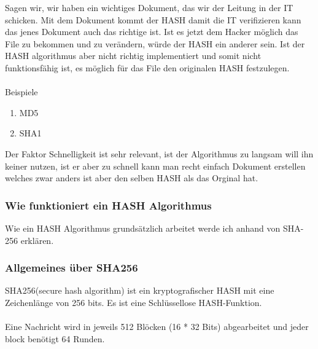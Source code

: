 {Sagen wir, wir haben ein wichtiges Dokument, das wir der Leitung in der IT schicken. Mit dem Dokument kommt der HASH damit die IT verifizieren kann das jenes Dokument auch das richtige ist. Ist es jetzt dem Hacker möglich das File zu bekommen und zu verändern, würde der HASH ein anderer sein. Ist der HASH algorithmus aber nicht richtig implementiert und somit nicht funktionsfähig ist, es möglich für das File den originalen HASH festzulegen.
\\ \\
Beispiele
\begin{enumerate}
\item MD5
\item SHA1
\end{enumerate}
Der Faktor Schnelligkeit ist sehr relevant, ist der Algorithmus zu langsam will ihn keiner nutzen, ist er aber zu schnell kann man recht einfach Dokument erstellen welches zwar anders ist aber den selben HASH als das Orginal hat.
\subsubsection{Wie funktioniert ein HASH Algorithmus}
Wie ein HASH Algorithmus grundsätzlich arbeitet werde ich anhand von SHA-256 erklären. 
\subsubsection{Allgemeines über SHA256}
SHA256(secure hash algorithm) ist ein kryptografischer HASH mit eine Zeichenlänge von 256 bits. Es ist eine Schlüssellose HASH-Funktion.
\\ \\
Eine Nachricht wird in jeweils 512 Blöcken (16 * 32 Bits) abgearbeitet und jeder block benötigt 64 Runden.
}
